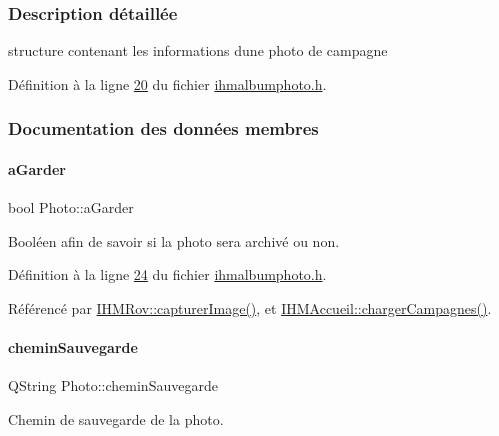 \subsubsection{Description détaillée}
structure contenant les informations d\textquotesingle{}une photo de campagne 

Définition à la ligne \hyperlink{ihmalbumphoto_8h_source_l00020}{20} du fichier \hyperlink{ihmalbumphoto_8h_source}{ihmalbumphoto.\+h}.



\subsubsection{Documentation des données membres}
\mbox{\label{struct_photo_afec1baefdd7d036432494bbb33b21366}} 
\paragraph{\texorpdfstring{a\+Garder}{aGarder}}
{\footnotesize\ttfamily bool Photo\+::a\+Garder}



Booléen afin de savoir si la photo sera archivé ou non. 



Définition à la ligne \hyperlink{ihmalbumphoto_8h_source_l00024}{24} du fichier \hyperlink{ihmalbumphoto_8h_source}{ihmalbumphoto.\+h}.



Référencé par \hyperlink{ihmrov_8cpp_source_l00179}{I\+H\+M\+Rov\+::capturer\+Image()}, et \hyperlink{ihmaccueil_8cpp_source_l00130}{I\+H\+M\+Accueil\+::charger\+Campagnes()}.

\mbox{\label{struct_photo_a3c28eb9ad160b65deb46a72146a1d14f}} 
\paragraph{\texorpdfstring{chemin\+Sauvegarde}{cheminSauvegarde}}
{\footnotesize\ttfamily Q\+String Photo\+::chemin\+Sauvegarde}



Chemin de sauvegarde de la photo. 



